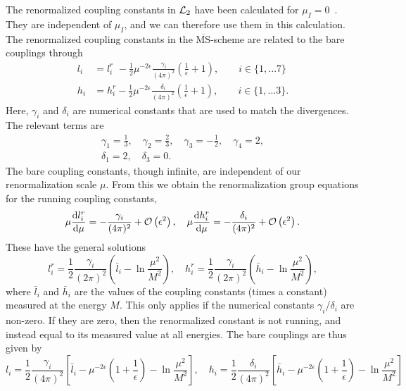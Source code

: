 The renormalized coupling constants in $\mathcal{L}_2$ have been calculated for $\mu_I = 0$~\cite{Gasser-Leutwyler:chiral}.
They are independent of $\mu_I$, and we can therefore use them in this calculation.
The renormalized coupling constants in the $\overline{\mathrm{MS}}$-scheme are related to the bare couplings through
\begin{align}
    l_i 
    & = 
    l_i^r \, \,
    - \frac{1}{2} \mu^{-2\epsilon} \frac{\gamma_i }{(4 \pi)^2} 
    \left(\frac{1}{\epsilon} + 1 \right),
    \quad \quad
    i \in \{1, ... 7\} 
    \\
    h_i 
    & = 
    h_i^r
    -\frac{1}{2} \mu^{-2\epsilon}  \frac{\delta_i }{(4 \pi)^2} 
    \left(\frac{1}{\epsilon} + 1 \right), 
    \quad \quad
    i \in \{1, ... 3\}.
\end{align}
Here, $\gamma_i$ and $\delta_i$ are numerical constants that are used to match the divergences.
The relevant terms are
\begin{gather}
    \gamma_1 = \frac{1}{3}, \quad
    \gamma_2 = \frac{2}{3}, \quad
    \gamma_3 = - \frac{1}{2}, \quad
    \gamma_4 = 2, \\
    \delta_1 = 2, \quad
    \delta_3 = 0.
\end{gather}
The bare coupling constants, though infinite, are independent of our renormalization scale $\mu$.
From this we obtain the renormalization group equations for the running coupling constants,
\begin{equation}
    \mu \diff{l_i^r}{\mu } = - \frac{\gamma_i}{(4 \pi)^2} + \Oh{\epsilon}, \quad
    \mu \diff{h_i^r}{\mu } = - \frac{\delta_i}{(4 \pi)^2} + \Oh{\epsilon}.
\end{equation}
These have the general solutions
\begin{equation}
    l_i^r 
    = \frac{1}{2} \frac{\gamma_i}{(2 \pi)^2} 
    \left( \bar l_i - \ln{\frac{\mu^2}{M^2}} \right),
    \quad
    h_i^r 
    = \frac{1}{2} \frac{\gamma_i}{(2 \pi)^2} 
    \left( \bar h_i - \ln{\frac{\mu^2}{M^2}} \right),
\end{equation}
where $\bar l_i$ and $\bar h_i$ are the values of the coupling constants (times a constant) measured at the energy $M$.
This only applies if the numerical constants $\gamma_i$/$\delta_i$ are non-zero.
If they are zero, then the renormalized constant is not running, and instead equal to its measured value at all energies.
The bare couplings are thus given by
\begin{equation}
    l_i = \frac{1}{2} \frac{\gamma_i}{(4 \pi)^2}
    \left[\bar l_i - \mu^{-2 \epsilon}\left(1+ \frac{1}{\epsilon}\right) - \ln\frac{\mu^2}{M^2}\right], \quad
    h_i = \frac{1}{2} \frac{\delta_i}{(4 \pi)^2}
    \left[\bar h_i - \mu^{-2 \epsilon}\left(1+ \frac{1}{\epsilon}\right)- \ln\frac{\mu^2}{M^2}\right]
\end{equation}
